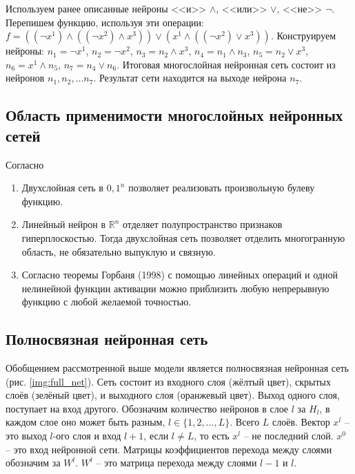 Используем ранее описанные нейроны <<и>> $\wedge$, <<или>> $\vee$, <<не>> $\neg$. Перепишем функцию, используя эти операции: $f = ((\neg x^1) \wedge ((\neg x^2) \wedge x^3)) \vee (x^1 \wedge ((\neg x^2) \vee x^3))$. Конструируем нейроны: $n_1 = \neg x^1$, $n_2 = \neg x^2$, $n_3 = n_2 \wedge x^3$, $n_4 = n_1 \wedge n_3$, $n_5 = n_2 \vee x^3$, $n_6 = x^1 \wedge n_5$, $n_7 = n_4 \vee n_6$. Итоговая многослойная нейронная сеть состоит из нейронов $n_1, n_2, \dots n_7$. Результат сети находится на выходе нейрона $n_7$.

\newpage

\subsection{Область применимости многослойных нейронных сетей}

Согласно \cite{VorontsovSite}
\begin{enumerate}
	\item Двухслойная сеть в ${0, 1}^n$ позволяет реализовать произвольную булеву функцию.
	
	\item Линейный нейрон в $\mathbb{R}^n$ отделяет полупространство признаков гиперплоскостью. Тогда двухслойная сеть позволяет отделить многогранную область, не обязательно выпуклую и связную.
	
	\item Согласно теоремы Горбаня (1998) с помощью линейных операций и одной нелинейной функции активации можно приблизить любую непрерывную функцию с любой желаемой точностью.
\end{enumerate}

\subsection{Полносвязная нейронная сеть}

Обобщением рассмотренной выше модели является полносвязная нейронная сеть (рис. \ref{img:full_net}). Сеть состоит из входного слоя (жёлтый цвет), скрытых слоёв (зелёный цвет), и выходного слоя (оранжевый цвет). Выход одного слоя, поступает на вход другого. Обозначим количество нейронов в слое $l$ за $H_l$, в каждом слое оно может быть разным, $l \in \{1, 2, \dots, L\}$. Всего $L$ слоёв. Вектор $x^l$ -- это выход $l$-ого слоя и вход $l+1$, если $l \neq L$, то есть $x^l$ -- не последний слой. $x^0$ -- это вход нейронной сети. Матрицы коэффициентов перехода между слоями обозначим за $W^l$. $W^l$ -- это матрица перехода между слоями $l-1$ и $l$.

